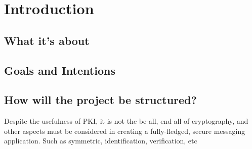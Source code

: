 
\chapter{Introduction} %
\label{Chapter1}


\section{What it's about}

\section{Goals and Intentions}

\section{How will the project be structured?}

Despite the usefulness of PKI, it is not the be-all, end-all of cryptography, and other aspects must be considered in creating a fully-fledged, secure messaging application. Such as symmetric, identification, verification, etc
